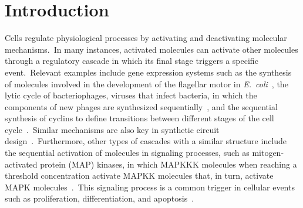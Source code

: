 \documentclass[aps,prb,reprint,superscriptaddress]{revtex4-2}
\begin{document}
\maketitle





\section{Introduction}\label{intro}

Cells regulate physiological processes by activating and deactivating molecular mechanisms.~In many instances, activated molecules can activate other molecules through a regulatory cascade in which its final stage triggers a specific event.~Relevant examples include gene expression systems such as the synthesis of molecules involved in the development of the flagellar motor in \textit{E.~coli}~\cite{kalir2001ordering}, the lytic cycle of bacteriophages, viruses that infect bacteria, in which the components of new phages are synthesized sequentially~\cite{singh2014stochastic,mondal2024molecular}, and the sequential synthesis of cyclins to define transitions between different stages of the cell cycle~\cite{matthews2022cell}.~Similar mechanisms are also key in synthetic circuit design~\cite{english2021designing}.~Furthermore, other types of cascades with a similar structure include the sequential activation of molecules in signaling processes, such as mitogen-activated protein (MAP) kinases, in which MAPKKK molecules when reaching a threshold concentration activate MAPKK molecules that, in turn, activate MAPK molecules~\cite{avruch2007map}.~This signaling process is a common trigger in cellular events such as proliferation, differentiation, and apoptosis~\cite{ng2024role}.
\end{document}
